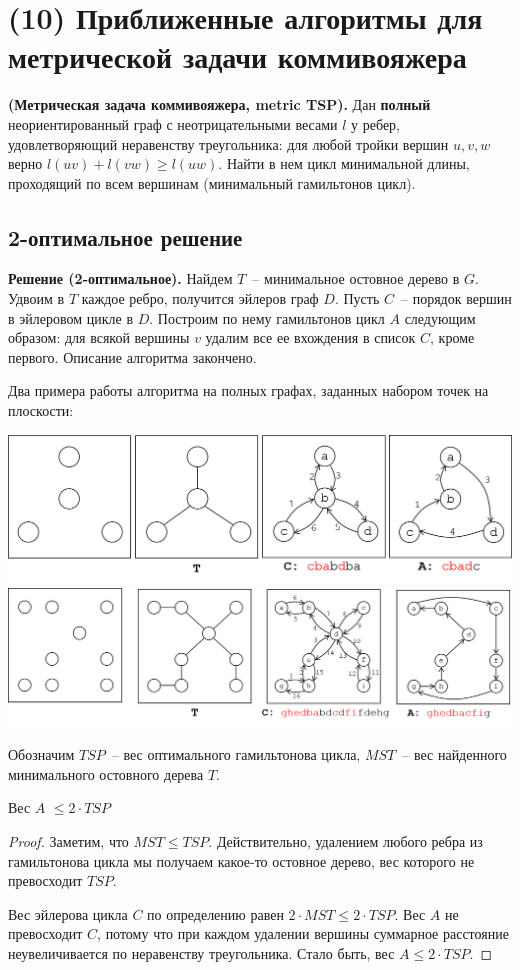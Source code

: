 \section{(10) Приближенные алгоритмы для метрической задачи коммивояжера}

\begin{problem*}\textbf{(Метрическая задача коммивояжера, metric TSP).} Дан \textbf{полный} неориентированный граф с неотрицательными весами $l$ у ребер, удовлетворяющий неравенству треугольника: для любой тройки вершин $u, v, w$ верно $l(uv) + l(vw) \geq l(uw)$. Найти в нем цикл минимальной длины, проходящий по всем вершинам (минимальный гамильтонов цикл). \end{problem*}

\subsection{2-оптимальное решение}
\textbf{Решение (2-оптимальное).} Найдем $T$~-- минимальное остовное дерево в $G$. Удвоим в $T$ каждое ребро, получится эйлеров граф $D$. Пусть $C$~-- порядок вершин в эйлеровом цикле в $D$. Построим по нему гамильтонов цикл $A$ следующим образом: для всякой вершины $v$ удалим все ее вхождения в список $C$, кроме первого. Описание алгоритма закончено.

Два примера работы алгоритма на полных графах, заданных набором точек на плоскости:

\includegraphics[width=\textwidth]{figures/ex_shorthamil.png} \\
\includegraphics[width=\textwidth]{figures/ex_longhamil.png}

Обозначим $TSP$~-- вес оптимального гамильтонова цикла, $MST$~-- вес найденного минимального остовного дерева $T$.
\begin{theorem*} Вес $A$ $\leq 2 \cdot TSP$ \end{theorem*}
\begin{proof}
Заметим, что $MST \leq TSP$. Действительно, удалением любого ребра из гамильтонова цикла мы получаем какое-то остовное дерево, вес которого не превосходит $TSP$.

Вес эйлерова цикла $C$ по определению равен $2\cdot MST \leq 2\cdot TSP$. Вес $A$ не превосходит $C$, потому что при каждом удалении вершины суммарное расстояние неувеличивается по неравенству треугольника. Стало быть, вес $A \leq 2 \cdot TSP$.
\end{proof}

